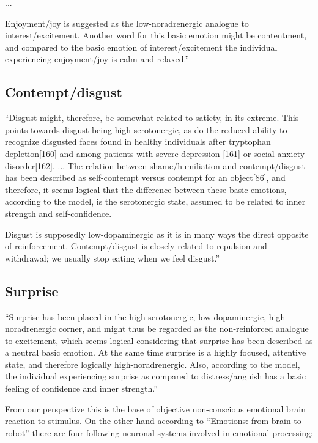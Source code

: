...

Enjoyment/joy is suggested as the low-noradrenergic analogue to interest/excitement. Another word for this basic emotion might
be contentment, and compared to the basic emotion of interest/excitement the individual experiencing enjoyment/joy is calm and relaxed.''

\subsection{Contempt/disgust}

``Disgust might, therefore, be somewhat related to satiety, in its extreme. This points towards disgust being high-serotonergic, as do the reduced ability to recognize disgusted faces found in healthy individuals after tryptophan depletion[160] and among patients with severe depression [161] or social anxiety disorder[162]. ... The relation between shame/humiliation and contempt/disgust has been described as self-contempt versus contempt for an object[86], and therefore, it seems logical that the difference between these basic emotions, according to the model, is the serotonergic state, assumed to be related to inner strength and self-confidence.

Disgust is supposedly low-dopaminergic as it is in many ways the direct opposite of reinforcement. Contempt/disgust is closely
related to repulsion and withdrawal; we usually stop eating when we feel disgust.''

\subsection{Surprise}

``Surprise has been placed in the high-serotonergic, low-dopaminergic, high-noradrenergic corner, and might thus be regarded as the non-reinforced analogue to excitement, which seems logical considering that surprise has been described as a neutral basic emotion. At the same time surprise is a highly focused, attentive state, and therefore logically high-noradrenergic. Also, according to the model, the individual experiencing surprise as compared to distress/anguish has a basic feeling of confidence and inner strength.''

From our perspective this is the base of objective non-conscious emotional brain reaction to stimulus. On the other hand according to ``Emotions: from brain to robot'' \cite{emotionsbraintorobot} there are four following neuronal systems involved in emotional processing:

